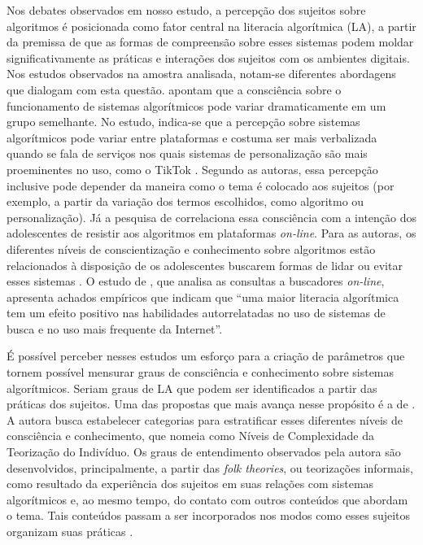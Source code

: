 Nos debates observados em nosso estudo, a percepção dos sujeitos sobre
algoritmos é posicionada como fator central na literacia algorítmica
(LA), a partir da premissa de que as formas de compreensão sobre esses
sistemas podem moldar significativamente as práticas e interações dos
sujeitos com os ambientes digitais. Nos estudos observados na amostra
analisada, notam-se diferentes abordagens que dialogam com esta questão.
\textcite{Bell2023} apontam que a consciência sobre o
funcionamento de sistemas algorítmicos pode variar dramaticamente em um
grupo semelhante. No estudo, indica-se que a percepção sobre sistemas
algorítmicos pode variar entre plataformas e costuma ser mais
verbalizada quando se fala de serviços nos quais sistemas de
personalização são mais proeminentes no uso, como o TikTok \cite{Bell2023}. Segundo as autoras, essa percepção inclusive pode
depender da maneira como o tema é colocado aos sujeitos (por exemplo, a
partir da variação dos termos escolhidos, como algoritmo ou
personalização). Já a pesquisa de \textcite{Lv2022} correlaciona
essa consciência com a intenção dos adolescentes de resistir aos
algoritmos em plataformas \textit{on-line}. Para as autoras, os diferentes níveis
de conscientização e conhecimento sobre algoritmos estão relacionados à
disposição de os adolescentes buscarem formas de lidar ou evitar esses
sistemas \cite{Lv2022}. O estudo de \cite[p.~352]{Parnell2022}, que analisa as consultas a buscadores \textit{on-line}, apresenta
achados empíricos que indicam que ``uma maior literacia algorítmica tem
um efeito positivo nas habilidades autorrelatadas no uso de sistemas de
busca e no uso mais frequente da Internet''.

É possível perceber nesses estudos um esforço para a criação de
parâmetros que tornem possível mensurar graus de consciência e
conhecimento sobre sistemas algorítmicos. Seriam graus de LA que podem
ser identificados a partir das práticas dos sujeitos. Uma das propostas
que mais avança nesse propósito é a de \textcite{Devito2021}. A autora busca
estabelecer categorias para estratificar esses diferentes níveis de
consciência e conhecimento, que nomeia como Níveis de Complexidade da
Teorização do Indivíduo. Os graus de entendimento observados pela autora
são desenvolvidos, principalmente, a partir das \emph{folk theories}, ou
teorizações informais, como resultado da experiência dos sujeitos em
suas relações com sistemas algorítmicos e, ao mesmo tempo, do contato
com outros conteúdos que abordam o tema. Tais conteúdos passam a ser
incorporados nos modos como esses sujeitos organizam suas práticas
\cite{Devito2021}.

